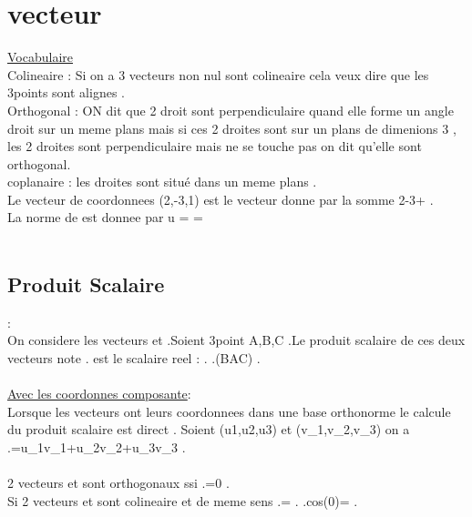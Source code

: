 \documentclass[a4paper,8pt,openany]{book}
\begin{document}
\section{vecteur}
\underline{Vocabulaire}\\
Colineaire : Si on a 3 vecteurs non nul sont colineaire cela veux dire que les 3points sont alignes .\\
Orthogonal : ON dit que 2 droit sont perpendiculaire quand elle forme un angle droit sur un meme plans mais si ces 2 droites sont sur un plans de dimenions 3 , les 2 droites sont perpendiculaire mais ne se touche pas on dit qu'elle sont orthogonal.\\
coplanaire : les droites sont situé dans un meme plans .\\

Le vecteur  de coordonnees (2,-3,1) est le vecteur donne par la somme 2-3+ .\\
La norme de  est donnee par \lVert u \rVert = =\\
\\

\subsection{Produit Scalaire} :\\
On considere les vecteurs  et  .Soient 3point A,B,C .Le produit scalaire de ces deux vecteurs note . est le scalaire reel : \lVert {} \rVert.\lVert {} \rVert.\cos(BAC) .\\
\\
\underline{Avec les coordonnes composante}:\\
Lorsque les vecteurs ont leurs coordonnees dans une base orthonorme le calcule du produit scalaire est direct .
Soient (u1,u2,u3) et (v_1,v_2,v_3) on a .=u_1v_1+u_2v_2+u_3v_3 .\\
\\
2 vecteurs  et  sont orthogonaux ssi .=0 .\\
Si 2 vecteurs  et  sont colineaire et de meme sens .=\lVert {} \rVert.\lVert {} \rVert.cos(0)=\lVert {} \rVert.\lVert {} \rVert \\
\end{document}
